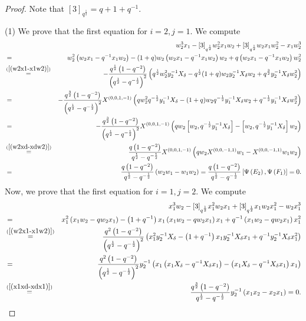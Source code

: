 \documentclass[reqno,11pt]{amsart}
\numberwithin{equation}{section}
\begin{document}
\begin{proof}
Note that $[3]_{q^{\frac{1}{2}}}=q+1+q^{-1}$.

 (1) We prove that the first equation for $i=2, j=1$.  We compute
 	\begingroup
\begin{eqnarray*}
	&& w_2^3 x_1-[3]_{q^{\frac{1}{2}}} w_2^2 x_1 w_2+[3]_{q^{\frac{1}{2}}} w_2 x_1 w_2^2-x_1 w_2^3 \\
	&= & w_2^2\left(w_2 x_1-q^{-1} x_1 w_2\right)-(1+q) w_2\left(w_2 x_1-q^{-1} x_1 w_2\right) w_2+q\left(w_2 x_1-q^{-1} x_1 w_2\right) w_2^2\\
	&\mathop  = \limits^{(\ref{(w2x1-x1w2)})} &-\frac{q^{\frac{1}{2}}\left(1-q^{-2}\right)}{\left(q^{\frac{1}{2}}-q^{-\frac{1}{2}}\right)^2}\left(q^{\frac{1}{2}} w_2^2 y_2^{-1} X_\delta-q^{\frac{1}{2}}(1+q) w_2 y_2^{-1} X_\delta w_2+q^{\frac{3}{2}} y_2^{-1} X_\delta w_2^2\right)  \\
	& =&-\frac{q^{\frac{3}{2}}\left(1-q^{-2}\right)}{\left(q^{\frac{1}{2}}-q^{-\frac{1}{2}}\right)^2} X^{(0,0,1,-1)}\left(q w_2^2 q^{-\frac{1}{2}} y_1^{-1} X_\delta-(1+q) w_2 q^{-\frac{1}{2}} y_1^{-1} X_\delta w_2+q^{-\frac{1}{2}} y_1^{-1} X_\delta w_2^2\right) \\
	& =&-\frac{q^{\frac{3}{2}}\left(1-q^{-2}\right)}{\left(q^{\frac{1}{2}}-q^{-\frac{1}{2}}\right)^2} X^{(0,0,1,-1)}\left(q w_2\left[w_2, q^{-\frac{1}{2}} y_1^{-1} X_\delta\right]-\left[w_2, q^{-\frac{1}{2}} y_1^{-1} X_\delta\right] w_2\right)\\
	& \mathop  = \limits^{(\ref{(w2xd-xdw2)})}&\frac{q\left(1-q^{-2}\right)}{q^{\frac{1}{2}}-q^{-\frac{1}{2}}} X^{(0,0,1,-1)}\left(q w_2 X^{(0,0,-1,1)} w_1-X^{(0,0,-1,1)} w_1 w_2\right)  \\
	& =&\frac{q\left(1-q^{-2}\right)}{q^{\frac{1}{2}}-q^{-\frac{1}{2}}}\left(w_2 w_1-w_1 w_2\right)=\frac{q\left(1-q^{-2}\right)}{q^{\frac{1}{2}}-q^{-\frac{1}{2}}}\left[\Psi\left(E_2\right), \Psi\left(F_1\right)\right]=0.
\end{eqnarray*}	
Now, we prove that the first equation for $i=1, j=2$. We compute
\begin{eqnarray*}
	&& x_1^3 w_2-[3]_{q^{\frac{1}{2}}} x_1^2 w_2 x_1+[3]_{q^{\frac{1}{2}}} x_1 w_2 x_1^2-w_2 x_1^3 \\
	&	= & x_1^2\left(x_1 w_2-q w_2 x_1\right)-\left(1+q^{-1}\right) x_1\left(x_1 w_2-q w_2 x_1\right) x_1 +q^{-1}\left(x_1 w_2-q w_2 x_1\right) x_1^2\\
	&\mathop  = \limits^{(\ref{(w2x1-x1w2)})}& \frac{q^2\left(1-q^{-2}\right)}{\left(q^{\frac{1}{2}}-q^{-\frac{1}{2}}\right)^2}\left(x_1^2 y_2^{-1} X_\delta-\left(1+q^{-1}\right) x_1 y_2^{-1} X_\delta x_1+q^{-1} y_2^{-1} X_\delta x_1^2\right)\\
	&=&\frac{q^2\left(1-q^{-2}\right)}{\left(q^{\frac{1}{2}}-q^{-\frac{1}{2}}\right)^2} y_2^{-1}\left(x_1\left(x_1 X_\delta-q^{-1} X_\delta x_1\right)-\left(x_1 X_\delta-q^{-1} X_\delta x_1\right) x_1\right)\\
	&\mathop  = \limits^{(\ref{(x1xd-xdx1)})}& \frac{q^{\frac{3}{2}}\left(1-q^{-2}\right)}{q^{\frac{1}{2}}-q^{-\frac{1}{2}}} y_2^{-1}\left(x_1 x_2-x_2 x_1\right)=0.
\end{eqnarray*}


\end{proof}
\end{document}
